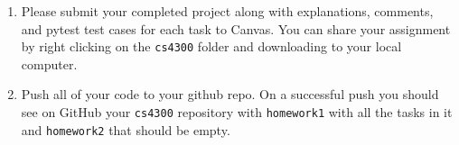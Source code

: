 \documentclass{article}
\begin{document}
\begin{enumerate}
    \item Please submit your completed project along with explanations, comments, and pytest test cases for each task to Canvas. You can share your assignment by right clicking on the \verb|cs4300| folder and downloading to your local computer.
    \item Push all of your code to your github repo. On a successful push you should see on GitHub your \verb|cs4300| repository with \verb|homework1| with all the tasks in it and \verb|homework2| that should be empty. 
\end{enumerate}
\end{document}
